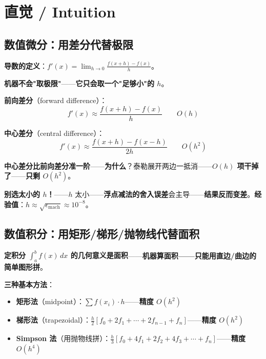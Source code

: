 \section{直觉 / Intuition}

\subsection{数值微分：用差分代替极限}

\textbf{导数的定义}：$f'(x) = \lim_{h \to 0} \frac{f(x+h) - f(x)}{h}$。

\textbf{机器不会"取极限"}——\textbf{它只会取一个"足够小"的 $h$}。

\textbf{前向差分}（forward difference）：
\begin{equation}
f'(x) \approx \frac{f(x+h) - f(x)}{h} \qquad O(h)
\end{equation}

\textbf{中心差分}（central difference）：
\begin{equation}
f'(x) \approx \frac{f(x+h) - f(x-h)}{2h} \qquad O(h^2)
\end{equation}

\textbf{中心差分比前向差分准一阶}——\textbf{为什么}？泰勒展开两边一抵消——\textbf{$O(h)$ 项干掉了}——\textbf{只剩 $O(h^2)$}。

\textbf{别选太小的 $h$！}——$h$ 太小——\textbf{浮点减法的舍入误差}会主导——\textbf{结果反而变差}。\textbf{经验值}：$h \approx \sqrt{\epsilon_{\text{mach}}} \approx 10^{-8}$。

\subsection{数值积分：用矩形/梯形/抛物线代替面积}

\textbf{定积分 $\int_a^b f(x) \, dx$ 的几何意义是面积}——\textbf{机器算面积——只能用直边/曲边的简单图形拼}。

\textbf{三种基本方法}：

\begin{itemize}
\item \textbf{矩形法}（midpoint）：$\sum f(x_i) \cdot h$——\textbf{精度 $O(h^2)$}
\item \textbf{梯形法}（trapezoidal）：$\frac{h}{2} [f_0 + 2f_1 + \cdots + 2f_{n-1} + f_n]$——\textbf{精度 $O(h^2)$}
\item \textbf{Simpson 法}（用抛物线拼）：$\frac{h}{3} [f_0 + 4f_1 + 2f_2 + 4f_3 + \cdots + f_n]$——\textbf{精度 $O(h^4)$}
\end{itemize}

